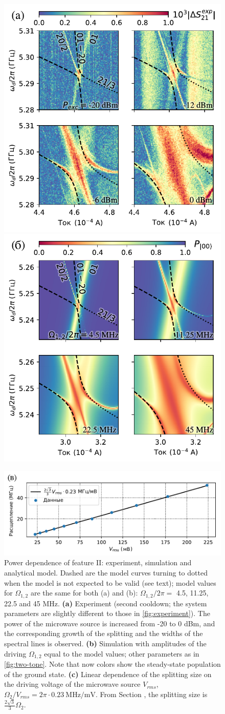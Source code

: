 \documentclass[14pt, a4paper]{extreport}
\numberwithin{equation}{section}
\begin{document}
\begin{figure}
	\includegraphics[width=.49\linewidth]{powerscan}
	\includegraphics[width=.49\linewidth]{zoom2_picture}
	
	\centering
	\includegraphics[width=.7\linewidth]{powerscan_1d}
	\caption{Power dependence of feature II: 
		experiment, simulation and analytical model. Dashed are the model curves turning to dotted when the 
		model is not expected to be valid (see text); model values for 
		$\Omega_{1,2}$ are the same for both (a) and 
		(b): $\Omega_{1,2}/2\pi=$ 4.5, 11.25, 22.5 
		and 45 MHz. \textbf{(a)} Experiment (second 
		cooldown; the system parameters are slightly different to 
		those in \autoref{fig:experiment}). The power 
		of the microwave source is increased from -20 
		to 0 dBm, and the corresponding growth of the 
		splitting and the widths of the spectral 
		lines is observed. \textbf{(b)} Simulation 
		with amplitudes of the driving $\Omega_{1,2}$ 
		equal to the model values; other parameters 
		as in \autoref{fig:two-tone}. Note that now 
		colors show the steady-state population of the ground 
		state. \textbf{(c)} Linear dependence of the 
		splitting size on the driving voltage of the 
		microwave source $V_{rms}$, ${\Omega_2}/{V_{rms}} = 2 \pi\cdot 0.23\ 
		{\text{MHz}}/{\text{mV}}$. From Section , the splitting size is 
		$\frac{2\sqrt{3}}{3} \Omega_2$.}
	\label{fig:zoom}
\end{figure}
\end{document}
